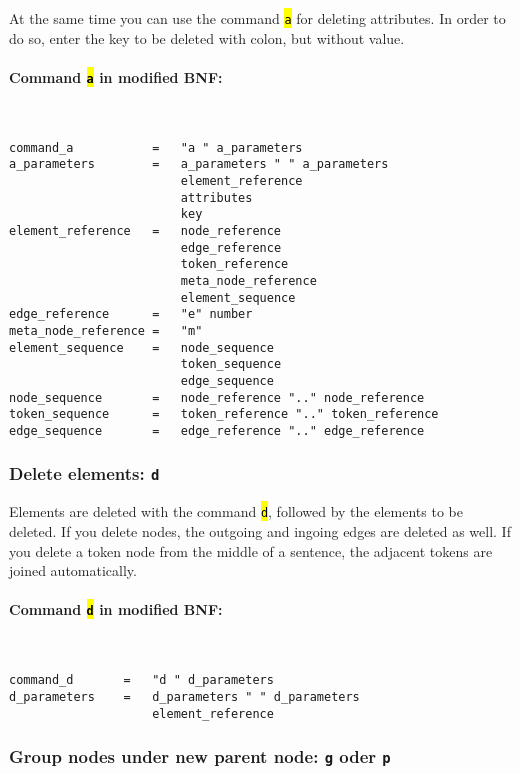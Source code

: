 \documentclass[12pt]{scrartcl}
\newcommand{\code}[1]{\hl{\texttt{#1}}}
\begin{document}
At the same time you can use the command \code{a} for deleting attributes.
In order to do so, enter the key to be deleted with colon, but without value.

\paragraph*{Command \code{a} in modified BNF:}
~
\begin{lstlisting}
command_a           =   "a " a_parameters
a_parameters        =   a_parameters " " a_parameters
                        element_reference
                        attributes
                        key
element_reference   =   node_reference
                        edge_reference
                        token_reference
                        meta_node_reference
                        element_sequence
edge_reference      =   "e" number
meta_node_reference =   "m"
element_sequence    =   node_sequence
                        token_sequence
                        edge_sequence
node_sequence       =   node_reference ".." node_reference
token_sequence      =   token_reference ".." token_reference
edge_sequence       =   edge_reference ".." edge_reference
\end{lstlisting}


\subsubsection{Delete elements: \texttt{d}}

Elements are deleted with the command \code{d}, followed by the elements to be deleted.
If you delete nodes, the outgoing and ingoing edges are deleted as well.
If you delete a token node from the middle of a sentence, the adjacent tokens are joined automatically.

\paragraph*{Command \code{d} in modified BNF:}
~
\begin{lstlisting}
command_d       =   "d " d_parameters
d_parameters    =   d_parameters " " d_parameters
                    element_reference
\end{lstlisting}


\subsubsection{Group nodes under new parent node: \texttt{g} oder \texttt{p}}
\end{document}
